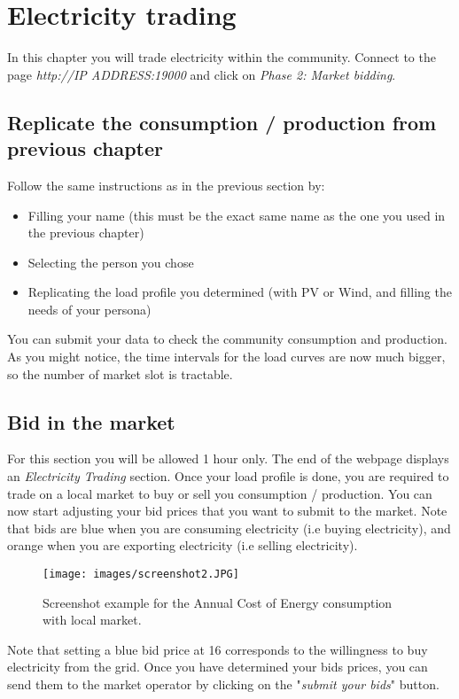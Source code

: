 \documentclass[a4paper, chapterprefix=true, openany]{scrbook}
\begin{document}
\chapter{Electricity trading}

In this chapter you will trade electricity within the community. Connect to the page \textit{http://IP ADDRESS:19000} and click on \textit{Phase 2: Market bidding}. 

\section{Replicate the consumption / production from previous chapter}
Follow the same instructions as in the previous section by:
\begin{itemize}
	\item Filling your name (this must be the exact same name as the one you used in the previous chapter)
	\item Selecting the person you chose
	\item Replicating the load profile you determined (with PV or Wind, and filling the needs of your persona)
\end{itemize}

You can submit your data to check the community consumption and production.
As you might notice, the time intervals for the load curves are now much bigger, so the number of market slot is tractable.

\section{Bid in the market}
For this section you will be allowed 1 hour only.
The end of the webpage displays an \textit{Electricity Trading} section. Once your load profile is done, you are required to trade on a local market to buy or sell you consumption / production. 
You can now start adjusting your bid prices that you want to submit to the market. Note that bids are blue when you are consuming electricity (i.e buying electricity), and orange when you are exporting electricity (i.e selling electricity).
\begin{figure}[h]
	\centerline{\texttt{[image: images/screenshot2.JPG]}}
	\caption{Screenshot example for the Annual Cost of Energy consumption with local market.}
	\label{screenshot2}
\end{figure}
Note that setting a blue bid price at 16 corresponds to the willingness to buy electricity from the grid.
Once you have determined your bids prices, you can send them to the market operator by clicking on the "\textit{submit your bids}" button.
\end{document}
